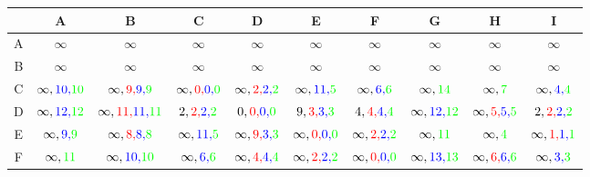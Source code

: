 \documentclass[a4paper,10pt]{article}
\begin{document}
 

\begin{table}[H]
\centering
\begin{tabular}{|c|c|c|c|c|c|c|c|c|c|} \hline
 & A & B & C & D & E & F & G & H & I  \\\hline
A & $ \infty $ & $\infty $ & $ \infty$ & $\infty $ & $\infty $ & $\infty $ & $\infty $ & $\infty $ & $ \infty$ \\\hline
B & $\infty $ & $\infty $ & $ \infty$ & $\infty $ & $ \infty$ & $\infty $ & $ \infty$ & $ \infty$ & $ \infty$ \\\hline
C & $\infty,{\color{blue}10,}{\color{green}10} $ & $\infty,{\color{red}9,}{\color{blue}9,}{\color{green}9} $ & $ \infty,{\color{red}0,}{\color{blue}0,}{\color{green}0}$ & $\infty,{\color{red}2,}{\color{blue}2,}{\color{green}2} $ & $ \infty,{\color{blue}11,}{\color{green}5}$ & $\infty,{\color{blue}6,}{\color{green}6} $ & $ \infty,{\color{green}14}$ & $ \infty,{\color{green}7}$ & $\infty,{\color{blue}4,}{\color{green}4} $ \\\hline
D & $\infty,{\color{blue}12,}{\color{green}12} $ & $\infty,{\color{red}11,}{\color{blue}11,}{\color{green}11} $ & $ 2,{\color{red}2,}{\color{blue}2,}{\color{green}2}$ & $0,{\color{red}0,}{\color{blue}0,}{\color{green}0} $ & $9,{\color{red}3,}{\color{blue}3,}{\color{green}3} $ & $ 4,{\color{red}4,}{\color{blue}4,}{\color{green}4}$ & $\infty,{\color{blue}12,}{\color{green}12} $ & $\infty,{\color{red}5,}{\color{blue}5,}{\color{green}5} $ & $2,{\color{red}2,}{\color{blue}2,}{\color{green}2} $ \\\hline
E & $\infty,{\color{blue}9,}{\color{green}9} $ & $\infty,{\color{red}8,}{\color{blue}8,}{\color{green}8} $ & $ \infty,{\color{blue}11,}{\color{green}5}$ & $\infty,{\color{red}9,}{\color{blue}3,}{\color{green}3} $ & $\infty,{\color{red}0,}{\color{blue}0,}{\color{green}0} $ & $\infty,{\color{red}2,}{\color{blue}2,}{\color{green}2} $ & $ \infty,{\color{green}11}$ & $ \infty,{\color{green}4}$ & $\infty,{\color{red}1,}{\color{blue}1,}{\color{green}1} $ \\\hline
F & $\infty,{\color{green}11} $ & $\infty,{\color{blue}10,}{\color{green}10} $ & $ \infty,{\color{blue}6,}{\color{green}6}$ & $\infty,{\color{red}4,}{\color{blue}4,}{\color{green}4} $ & $\infty,{\color{red}2,}{\color{blue}2,}{\color{green}2} $ & $\infty,{\color{red}0,}{\color{blue}0,}{\color{green}0} $ & $ \infty,{\color{blue}13,}{\color{green}13}$ & $ \infty,{\color{red}6,}{\color{blue}6,}{\color{green}6}$ & $\infty,{\color{blue}3,}{\color{green}3} $ \\\hline

\end{tabular}
\end{table}
\end{document}
